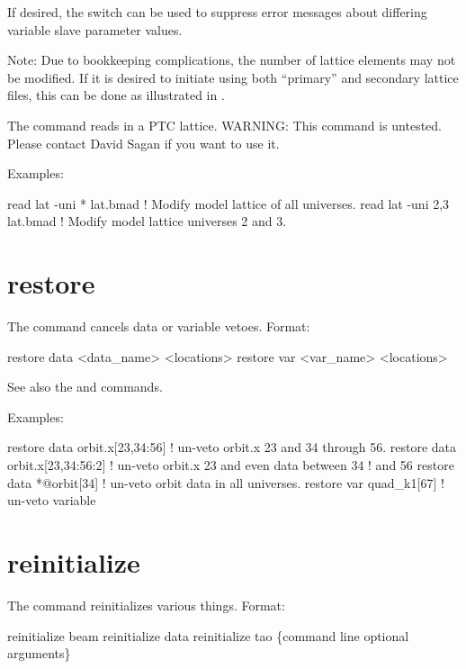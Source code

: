 If desired, the  switch can be used to suppress error messages about differing \tao
variable slave parameter values.

Note: Due to bookkeeping complications, the number of lattice elements may not be
modified. If it is desired to initiate \tao using both ``primary'' and secondary lattice
files, this can be done as illustrated in .

The  command reads in a PTC lattice. WARNING: This command is untested. Please contact
David Sagan if you want to use it.

Examples:
\begin{example}
  read lat -uni * lat.bmad   ! Modify model lattice of all universes.
  read lat -uni 2,3 lat.bmad ! Modify model lattice universes 2 and 3.
\end{example}

\section{restore}
\label{s:restore}

The  command cancels data or variable
vetoes. Format:
\begin{example}
  restore data  <data_name> <locations>
  restore var <var_name> <locations>
\end{example}

\vskip 10pt 

See also the  and  commands.

Examples:
\begin{example}
  restore data orbit.x[23,34:56]   ! un-veto orbit.x 23 and 34 through 56.
  restore data orbit.x[23,34:56:2] ! un-veto orbit.x 23 and even data between 34 
                                   !                                          and 56
  restore data *@orbit[34]         ! un-veto orbit data in all universes.
  restore var quad_k1[67]          ! un-veto variable
\end{example}

\section{reinitialize}
\label{s:reinit}

The  command reinitializes various things. Format:
\begin{example}
  reinitialize beam
  reinitialize data
  reinitialize tao \{command line optional arguments\}
\end{example}

